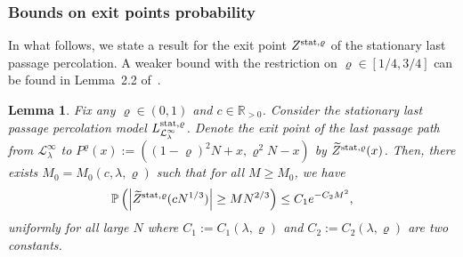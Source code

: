 \documentclass[12pt,a4paper]{article}
\numberwithin{equation}{section}
\newcommand{\Pb}{\mathbb{P}}
\newcommand{\R}{\mathbb{R}}
\newtheorem{lem}[prop]{Lemma}
\begin{document}
\subsubsection{Bounds on exit points probability}
In what follows, we state a result for the exit point $Z^{{\rm stat},\varrho}$ of the stationary last passage percolation. A weaker bound with the restriction on $\varrho\in [1/4,3/4]$ can be found in Lemma~2.2 of~\cite{Pi17}.
\begin{lem}\label{AlternativeExitPointLemma}
Fix any $\varrho\in (0,1)$ and $c\in\R_{>0}$. Consider the stationary last passage percolation model $L^{{\rm stat},\varrho}_{\mathcal{L}^{\infty}_{\lambda}}$. Denote the exit point of the last passage path from $\mathcal{L}^{\infty}_{\lambda}$ to $P^{\varrho}(x):=((1-\varrho)^2 N+x, \varrho^2 N-x)$ by $\widetilde Z^{{\rm stat},\varrho}(x)$. Then, there exists $M_0=M_0(c,\lambda,\varrho)$ such that for all $M\geq M_0$, we have
\begin{align}\label{eq:BoundOnTheExitPoint}
\Pb\left(\left|\widetilde Z^{{\rm stat},\varrho}(c N^{1/3})\right|\geq M N^{2/3}\right)\leq C_1 e^{- C_2M^2},
\end{align}
uniformly for all large $N$ where $C_1:= C_1( \lambda, \varrho)$ and $C_2:=C_2(\lambda,\varrho)$ are two constants.
\end{lem}
\end{document}
